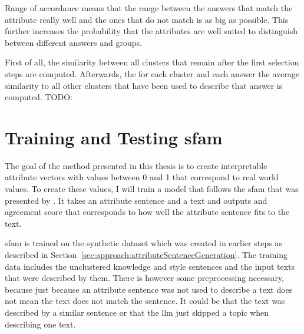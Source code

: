 Range of accordance means that the range between the answers that match the attribute really well and the ones that do not match is as big as possible. This further increases the probability that the attributes are well suited to distinguish between different answers and groups.

First of all, the similarity between all clusters that remain after the first selection steps are computed. Afterwards, the for each cluster and each answer the average similarity to all other clusters that have been used to describe that answer is computed. TODO:




\section{Training and Testing \acs{sfam}}
\label{sec:approach:sfam}

The goal of the method presented in this thesis is to create interpretable attribute vectors with values between \num{0} and \num{1} that correspond to real world values. To create these values, I will train a model that follows the \acf{sfam} that was presented by \citet{patelLearningInterpretableStyle2023}. It takes an attribute sentence and a text and outputs and agreement score that corresponds to how well the attribute sentence fits to the text.

\ac{sfam} is trained on the synthetic dataset which was created in earlier steps as described in Section~\ref{sec:approach:attributeSentenceGeneration}. The training data includes the unclustered knowledge and style sentences and the input texts that were described by them. There is however some preprocessing necessary, because just because an attribute sentence was not used to describe a text does not mean the text does not match the sentence. It could be that the text was described by a similar sentence or that the \ac{llm} just skipped a topic when describing one text.


